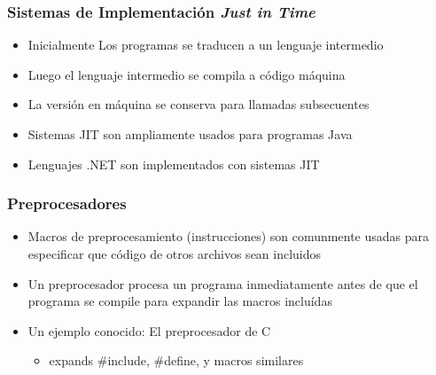 \documentclass[11pt]{article}
\begin{document}
\subsubsection*{Sistemas de Implementación \emph{Just in Time}}
\label{sec:orgheadline25}
\begin{itemize}
\item Inicialmente Los programas se traducen a un lenguaje intermedio
\item Luego el lenguaje intermedio se compila a código máquina
\item La versión en máquina se conserva para llamadas subsecuentes
\item Sistemas JIT son ampliamente usados para programas Java
\item Lenguajes .NET son implementados con sistemas JIT
\end{itemize}

\subsubsection*{Preprocesadores}
\label{sec:orgheadline26}
\begin{itemize}
\item Macros de preprocesamiento (instrucciones) son comunmente usadas
para especificar que código de otros archivos sean incluidos
\item Un preprocesador procesa un programa inmediatamente antes de que el
programa se compile para expandir las macros incluídas
\item Un ejemplo conocido: El preprocesador de C
\begin{itemize}
\item expands \#include, \#define, y macros similares
\end{itemize}
\end{itemize}
\end{document}
